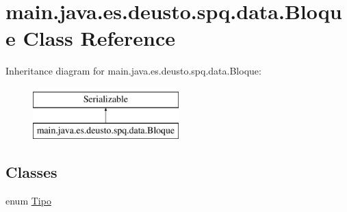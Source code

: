 \hypertarget{classmain_1_1java_1_1es_1_1deusto_1_1spq_1_1data_1_1_bloque}{}\section{main.\+java.\+es.\+deusto.\+spq.\+data.\+Bloque Class Reference}
\label{classmain_1_1java_1_1es_1_1deusto_1_1spq_1_1data_1_1_bloque}
Inheritance diagram for main.\+java.\+es.\+deusto.\+spq.\+data.\+Bloque\+:\begin{figure}[H]
\begin{center}
\leavevmode
\includegraphics[height=2.000000cm]{classmain_1_1java_1_1es_1_1deusto_1_1spq_1_1data_1_1_bloque}
\end{center}
\end{figure}
\subsection*{Classes}
\begin{DoxyCompactItemize}
\item 
enum \hyperlink{enummain_1_1java_1_1es_1_1deusto_1_1spq_1_1data_1_1_bloque_1_1_tipo}{Tipo}
\end{DoxyCompactItemize}
